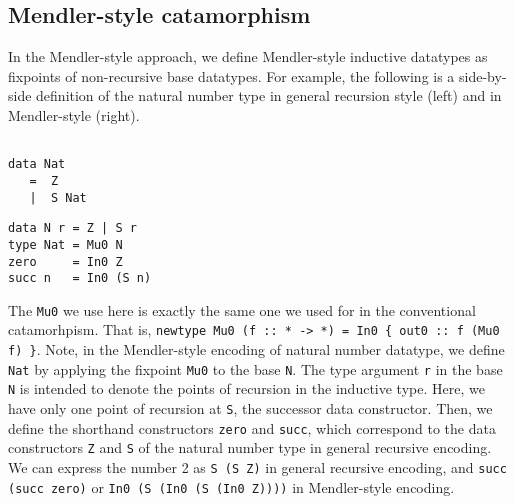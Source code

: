 \documentclass[letterpaper,12pt]{article}
\begin{document}
\subsection{Mendler-style catamorphism} \label{sec:bg:mcata}
In the Mendler-style approach, we define Mendler-style inductive datatypes
as fixpoints of non-recursive base datatypes.  For example, the following is
a side-by-side definition of the natural number type in general recursion
style (left) and in Mendler-style (right).
\begin{center}
\begin{minipage}{.49\linewidth}
\begin{verbatim}

data Nat
   =  Z
   |  S Nat
\end{verbatim}
\end{minipage}
\begin{minipage}{.49\linewidth}
\begin{verbatim}
data N r = Z | S r
type Nat = Mu0 N
zero     = In0 Z
succ n   = In0 (S n)
\end{verbatim}
\end{minipage}
\end{center}
The \verb|Mu0| we use here is exactly the same one we used for in
the conventional catamorhpism. That is,
\verb|newtype Mu0 (f :: * -> *) = In0 { out0 :: f (Mu0 f) }|.
Note, in the Mendler-style encoding of natural number datatype,
we define \verb|Nat| by applying the fixpoint \verb|Mu0| to the base \verb|N|. 
The type argument \verb|r| in the base \verb|N| is intended to denote
the points of recursion in the inductive type.  Here, we have only
one point of recursion at \verb|S|, the successor data constructor.
Then, we define the shorthand constructors \verb|zero| and \verb|succ|,
which correspond to the data constructors \verb|Z| and \verb|S| of
the natural number type in general recursive encoding.
We can express the number 2 as \texttt{S (S Z)} in general recursive encoding,
and \texttt{succ (succ zero)} or \texttt{In0 (S (In0 (S (In0 Z))))} in Mendler-style encoding.
\end{document}
